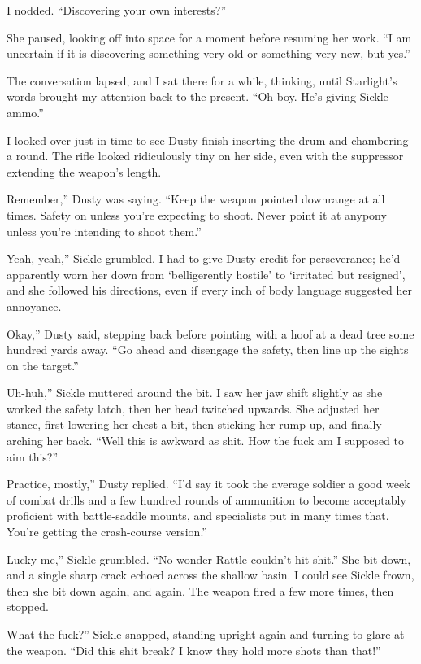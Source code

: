 I nodded. “Discovering your own interests?”

She paused, looking off into space for a moment before resuming her work. “I am uncertain if it is discovering something very old or something very new, but yes.”

The conversation lapsed, and I sat there for a while, thinking, until Starlight’s words brought my attention back to the present. “Oh boy. He’s giving Sickle ammo.”

I looked over just in time to see Dusty finish inserting the drum and chambering a round. The rifle looked ridiculously tiny on her side, even with the suppressor extending the weapon’s length.

\leavevmode{}Remember,” Dusty was saying. “Keep the weapon pointed downrange at all times. Safety on unless you’re expecting to shoot. Never point it at anypony unless you’re intending to shoot them.”

\leavevmode{}Yeah, yeah,” Sickle grumbled. I had to give Dusty credit for perseverance; he’d apparently worn her down from ‘belligerently hostile’ to ‘irritated but resigned’, and she followed his directions, even if every inch of body language suggested her annoyance.

\leavevmode{}Okay,” Dusty said, stepping back before pointing with a hoof at a dead tree some hundred yards away. “Go ahead and disengage the safety, then line up the sights on the target.”

\leavevmode{}Uh-huh,” Sickle muttered around the bit. I saw her jaw shift slightly as she worked the safety latch, then her head twitched upwards. She adjusted her stance, first lowering her chest a bit, then sticking her rump up, and finally arching her back. “Well this is awkward as shit. How the fuck am I supposed to aim this?”

\leavevmode{}Practice, mostly,” Dusty replied. “I’d say it took the average soldier a good week of combat drills and a few hundred rounds of ammunition to become acceptably proficient with battle-saddle mounts, and specialists put in many times that. You’re getting the crash-course version.”

\leavevmode{}Lucky me,” Sickle grumbled. “No wonder Rattle couldn’t hit shit.” She bit down, and a single sharp crack echoed across the shallow basin. I could see Sickle frown, then she bit down again, and again. The weapon fired a few more times, then stopped.

\leavevmode{}What the fuck?” Sickle snapped, standing upright again and turning to glare at the weapon. “Did this shit break? I know they hold more shots than that!”

